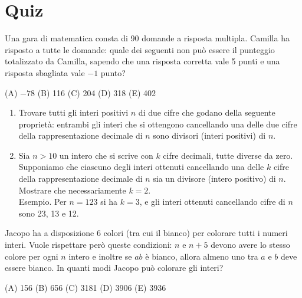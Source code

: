 \chapter{Quiz}
\label{ch:quiz}

\begin{esercizio}
    \label{ex:distrettuali_2018_1}
    Una gara di matematica consta di 90 domande a risposta multipla.
    Camilla ha risposto a tutte le domande: quale dei seguenti non può essere il punteggio totalizzato da Camilla,
    sapendo che una risposta corretta vale 5 punti e una risposta sbagliata vale $-1$ punto?

    (A) $-78$ \quad (B) 116 \quad (C) 204 \quad (D) 318 \quad (E) 402
\end{esercizio}

\begin{esercizio}
    \label{ex:distrettuali_2018_15}
    \begin{enumerate}
        \item Trovare tutti gli interi positivi $n$ di due cifre che godano della seguente proprietà: entrambi
        gli interi che si ottengono cancellando una delle due cifre della rappresentazione decimale
        di $n$ sono divisori (interi positivi) di $n$.
        \item Sia $n > 10$ un intero che si scrive con $k$ cifre decimali, tutte diverse da zero.
        Supponiamo che ciascuno degli interi ottenuti cancellando una delle $k$ cifre della rappresentazione decimale
        di $n$ sia un divisore (intero positivo) di $n$.
        Mostrare che necessariamente $k = 2$. \\
        Esempio.
        Per $n = 123$ si ha $k = 3$, e gli interi ottenuti cancellando cifre di $n$ sono 23, 13 e 12.
    \end{enumerate}
\end{esercizio}

\begin{esercizio}
    \label{ex:distrettuali_2019}
    Jacopo ha a disposizione 6 colori (tra cui il bianco) per colorare tutti i numeri interi.
    Vuole rispettare però queste condizioni: $n$ e $n + 5$ devono avere lo stesso colore per ogni $n$ intero e
    inoltre se $ab$ è bianco, allora almeno uno tra $a$ e $b$ deve essere bianco.
    In quanti modi Jacopo può colorare gli interi?

    (A) 156 \quad (B) 656 \quad (C) 3181 \quad (D) 3906 \quad (E) 3936
\end{esercizio}

